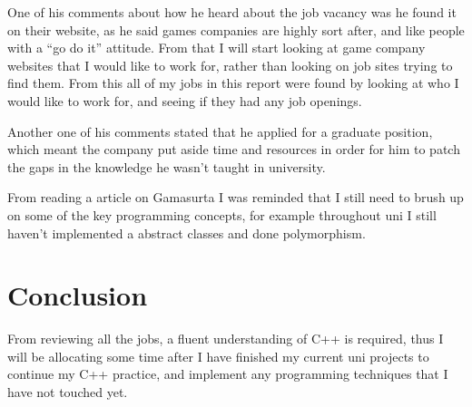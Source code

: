 \documentclass{scrartcl}
\begin{document}
One of his comments about how he heard about the job vacancy was he found it on their website, as he said games companies are highly sort after, and like people with a ``go do it'' attitude.
From that I will start looking at game company websites that I would like to work for, rather than looking on job sites trying to find them. 
From this all of my jobs in this report were found by looking at who I would like to work for, and seeing if they had any job openings.

Another one of his comments stated that he applied for a graduate position, which meant the company put aside time and resources in order for him to patch the gaps in the knowledge he wasn't taught in university.


From reading a article on Gamasurta \cite{programmerAdvice} I was reminded that I still need to brush up on some of the key programming concepts, for example throughout uni I still haven't implemented a abstract classes and done polymorphism.


\section{Conclusion}

From reviewing all the jobs, a fluent understanding of C++ is required, thus I will be allocating some time after I have finished my current uni projects to continue my C++ practice, and implement any programming techniques that I have not touched yet.
\end{document}
